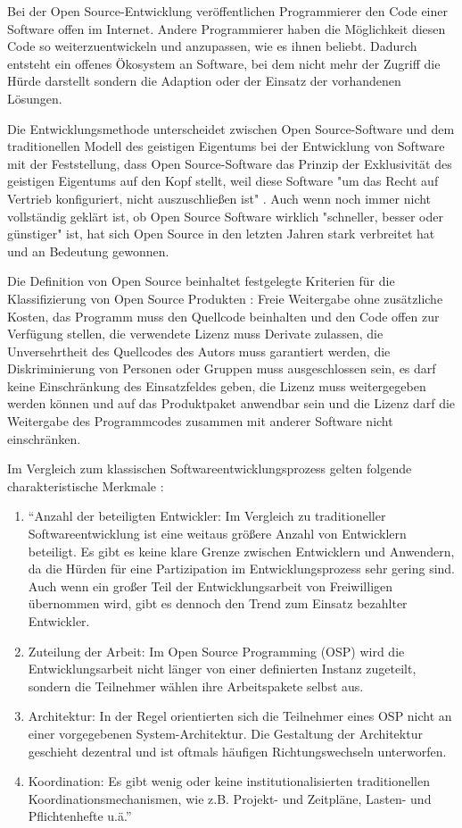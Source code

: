 Bei der Open Source-Entwicklung veröffentlichen Programmierer den Code einer Software offen im Internet. Andere Programmierer haben die Möglichkeit diesen Code so weiterzuentwickeln und anzupassen, wie es ihnen beliebt. Dadurch entsteht ein offenes Ökosystem an Software, bei dem nicht mehr der Zugriff die Hürde darstellt sondern die Adaption oder der Einsatz der vorhandenen Lösungen.

Die Entwicklungsmethode unterscheidet zwischen Open Source-Software und dem traditionellen Modell des geistigen Eigentums bei der Entwicklung von Software mit der Feststellung, dass Open Source-Software das Prinzip der Exklusivität des geistigen Eigentums auf den Kopf stellt, weil diese Software "um das Recht auf Vertrieb konfiguriert, nicht auszuschließen ist" \cite{suchen}. Auch wenn noch immer nicht vollständig geklärt ist, ob Open Source Software wirklich "schneller, besser oder günstiger" ist, hat sich Open Source in den letzten Jahren stark verbreitet hat \cite{Lerner_2001} und an Bedeutung gewonnen.

Die Definition von Open Source beinhaltet festgelegte Kriterien für die Klassifizierung von Open Source Produkten \cite{suchen}: Freie Weitergabe ohne zusätzliche Kosten, das Programm muss den Quellcode beinhalten und den Code offen zur Verfügung stellen, die verwendete Lizenz muss Derivate zulassen, die Unversehrtheit des Quellcodes des Autors muss garantiert werden, die Diskriminierung von Personen oder Gruppen muss ausgeschlossen sein, es darf keine Einschränkung des Einsatzfeldes geben, die Lizenz muss weitergegeben werden können und auf das Produktpaket anwendbar sein und die Lizenz darf die Weitergabe des Programmcodes zusammen mit anderer Software nicht einschränken.

Im Vergleich zum klassischen Softwareentwicklungsprozess gelten folgende charakteristische Merkmale \cite{suchen}:
\begin{enumerate}
\item “Anzahl der beteiligten Entwickler: Im Vergleich zu traditioneller Softwareentwicklung ist eine weitaus größere Anzahl von Entwicklern beteiligt. Es gibt es keine klare Grenze zwischen Entwicklern und Anwendern, da die Hürden für eine Partizipation im Entwicklungsprozess sehr gering sind. Auch wenn ein großer Teil der Entwicklungsarbeit von Freiwilligen übernommen wird, gibt es dennoch den Trend zum Einsatz bezahlter Entwickler.
\item Zuteilung der Arbeit: Im Open Source Programming (OSP) wird die Entwicklungsarbeit nicht länger von einer definierten Instanz zugeteilt, sondern die Teilnehmer wählen ihre Arbeitspakete selbst aus.
\item Architektur: In der Regel orientierten sich die Teilnehmer eines OSP nicht an einer vorgegebenen System-Architektur. Die Gestaltung der Architektur geschieht dezentral und ist oftmals häufigen Richtungswechseln unterworfen.
\item Koordination: Es gibt wenig oder keine institutionalisierten traditionellen Koordinationsmechanismen, wie z.B. Projekt- und Zeitpläne, Lasten- und Pflichtenhefte u.ä.” \cite{suchen}
\end{enumerate}

